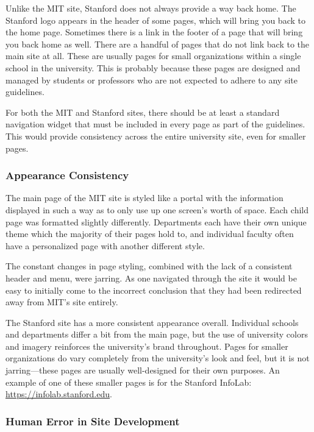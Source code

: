 Unlike the MIT site, Stanford does not always provide a way back home. The Stanford
logo appears in the header of some pages, which will bring you back to the home
page. Sometimes there is a link in the footer of a page that will bring you back
home as well. There are a handful of pages that do not link back to the main
site at all. These are usually pages for small organizations within a single
school in the university. This is probably because these pages are designed and
managed by students or professors who are not expected to adhere to any site
guidelines.

For both the MIT and Stanford sites, there should be at least a standard navigation
widget that must be included in every page as part of the guidelines. This would
provide consistency across the entire university site, even for smaller pages.

\subsubsection*{Appearance Consistency}

The main page of the MIT site is styled like a portal with the information displayed in such a way as to
only use up one screen's worth of space. Each child page was formatted slightly differently.
Departments each have their own unique theme which the majority of their pages hold to, and
individual faculty often have a personalized page with another different style.

The constant changes in page styling, combined with the lack of a consistent header and
menu, were jarring. As one navigated through the site it would be easy to initially
come to the incorrect conclusion that they had been redirected away from MIT's site entirely.

The Stanford site has a more consistent appearance overall. Individual schools and
departments differ a bit from the main page, but the use of university colors and imagery
reinforces the university's brand throughout. Pages for smaller organizations do
vary completely from the university's look and feel, but it is not jarring---these
pages are usually well-designed for their own purposes. An example of one of these
smaller pages is for the Stanford InfoLab: \url{https://infolab.stanford.edu}.

\subsubsection*{Human Error in Site Development}

